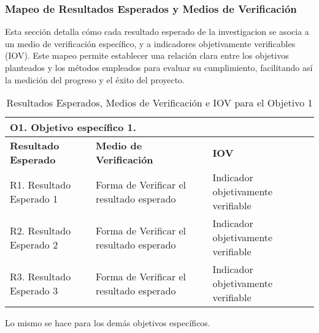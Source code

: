 \subsubsection{Mapeo de Resultados Esperados y Medios de Verificación}
\label{subsubsec:mapeo_objetivos}

Esta sección detalla cómo cada resultado esperado de la investigacion se asocia a un medio de verificación específico, y a indicadores
objetivamente verificables (IOV). Este mapeo permite establecer una relación clara entre los objetivos planteados y los métodos
empleados para evaluar su cumplimiento, facilitando así la medición del progreso y el éxito del proyecto.

\begin{table}[h!]
    \centering
    {\footnotesize
        \begin{tabular}{|p{4cm}|p{5.5cm}|p{5.5cm}|}
            \hline
            \multicolumn{3}{|p{15cm}|}{\textbf{O1. Objetivo específico 1.}}                                             \\
            \hline
            \textbf{Resultado Esperado} & \textbf{Medio de Verificación}           & \textbf{IOV}                       \\
            \hline
            R1. Resultado Esperado 1    & Forma de Verificar el resultado esperado & Indicador objetivamente verifiable \\
            \hline
            R2. Resultado Esperado 2    & Forma de Verificar el resultado esperado & Indicador objetivamente verifiable \\
            \hline
            R3. Resultado Esperado 3    & Forma de Verificar el resultado esperado & Indicador objetivamente verifiable \\
            \hline
        \end{tabular}
    }
    \caption{Resultados Esperados, Medios de Verificación e IOV para el Objetivo 1}
    \label{tab:mapeo_objetivos_1}

\end{table}

Lo mismo se hace para los demás objetivos específicos.